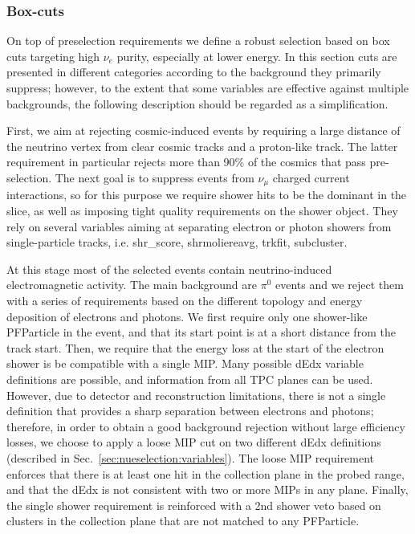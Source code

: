 \documentclass[a4paper]{article}
\begin{document}
\subsubsection{Box-cuts}

On top of preselection requirements we define a robust selection based on box cuts targeting high $\nu_e$ purity, especially at lower energy.
In this section cuts are presented in different categories according to the background they primarily suppress; however, to the extent that some variables are effective against multiple backgrounds, the following description should be regarded as a simplification.

First, we aim at rejecting cosmic-induced events by requiring a large distance of the neutrino vertex from clear cosmic tracks and a proton-like track. The latter requirement in particular rejects more than 90\% of the cosmics that pass pre-selection. The next goal is to suppress events from $\nu_\mu$ charged current interactions, so for this purpose we require shower hits to be the dominant in the slice, as well as imposing tight quality requirements on the shower object. They rely on several variables aiming at separating electron or photon showers from single-particle tracks, i.e. shr\_score, shrmoliereavg, trkfit, subcluster. 

At this stage most of the selected events contain neutrino-induced electromagnetic activity. The main background are $\pi^0$ events and we reject them with a series of requirements based on the different topology and energy deposition of electrons and photons. We first require only one shower-like PFParticle in the event, and that its start point is at a short distance from the track start. Then, we require that the energy loss at the start of the electron shower is be compatible with a single MIP. Many possible dEdx variable definitions are possible, and information from all TPC planes can be used. However, due to detector and reconstruction limitations, there is not a single definition that provides a sharp separation between electrons and photons; therefore, in order to obtain a good background rejection without large efficiency losses, we choose to apply a loose MIP cut on two different dEdx definitions (described in Sec.~\ref{sec:nueselection:variables}). The loose MIP requirement enforces that there is at least one hit in the collection plane in the probed range, and that the dEdx is not consistent with two or more MIPs in any plane. Finally, the single shower requirement is reinforced with a 2nd shower veto based on clusters in the collection plane that are not matched to any PFParticle.
\end{document}
